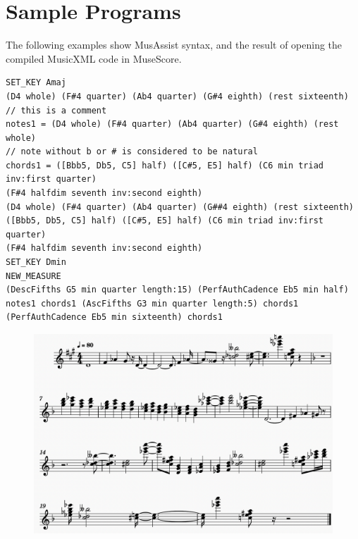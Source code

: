 \documentclass{report}
\begin{document}
\chapter{Sample Programs}
The following examples show MusAssist syntax, and the result of opening the compiled MusicXML code in MuseScore.

\begin{verbatim}
SET_KEY Amaj
(D4 whole) (F#4 quarter) (Ab4 quarter) (G#4 eighth) (rest sixteenth)           
// this is a comment
notes1 = (D4 whole) (F#4 quarter) (Ab4 quarter) (G#4 eighth) (rest whole)  
// note without b or # is considered to be natural
chords1 = ([Bbb5, Db5, C5] half) ([C#5, E5] half) (C6 min triad inv:first quarter) 
(F#4 halfdim seventh inv:second eighth)
(D4 whole) (F#4 quarter) (Ab4 quarter) (G##4 eighth) (rest sixteenth)
([Bbb5, Db5, C5] half) ([C#5, E5] half) (C6 min triad inv:first quarter) 
(F#4 halfdim seventh inv:second eighth)
SET_KEY Dmin
NEW_MEASURE
(DescFifths G5 min quarter length:15) (PerfAuthCadence Eb5 min half)
notes1 chords1 (AscFifths G3 min quarter length:5) chords1 
(PerfAuthCadence Eb5 min sixteenth) chords1
\end{verbatim}

\begin{figure}[h!]
\centering
\includegraphics[width=\textwidth]{images/program1}
\end{figure}

\end{document}
